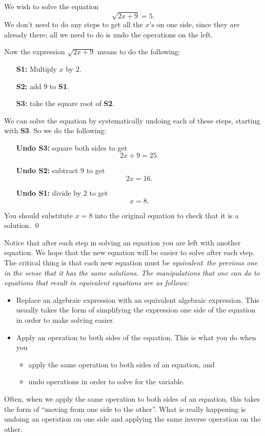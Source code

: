 \begin{eg} We wish to solve the equation
\[
\sqrt{2x+9} = 5.
\]
We don't need to do any steps to get all the $x$'s on one side, since they are already there; all we need to do is undo the operations on the left.

Now the expression $\sqrt{2x+9}$ means to do the following:

\begin{itemize}
    \item[\bf S1:] Multiply $x$ by $2$.
    \item[\bf S2:] add $9$ to {\bf S1}.
    \item[\bf S3:]  take the square root of {\bf S2}. 
\end{itemize}

We can solve the equation by systematically undoing each of these steps, starting with {\bf S3}.  So we do the following:
\begin{itemize}
    \item[\bf Undo S3:]  square both sides to get 
\[
2x+9 = 25.
\]
\item[\bf Undo S2:] subtract $9$ to get \[
2x = 16.
\]
\item[\bf Undo S1:]  divide by $2$ to get
\[
x=8.\]
\end{itemize}


You should substitute $x=8$ into the original equation to check that it is a solution.
\qed
\end{eg}
\par

Notice that after each step in solving an equation you are left with another equation. We hope that the new equation will be easier to solve after each step. The critical thing is that each new equation must be \it{equivalent}\ \normalfont the previous one in the sense that it has the same solutions. The manipulations that one can do to equations that result in equivalent equations are as follows:
\begin{itemize}
\item Replace an algebraic expression with an equivalent algebraic expression. This usually takes the form of simplifying the expression one side of the equation in order to make solving easier.
\item Apply an operation to both sides of the equation. This is what you do when you
\begin{itemize}
\item apply the same operation to both sides of an equation, and
\item undo operations in order to solve for the variable.
\end{itemize}
\end{itemize}
Often, when we apply the same operation to both sides of an equation, this takes the form of ``moving from one side to the other''. What is really happening is undoing an operation on one side and applying the same inverse operation on the other.

